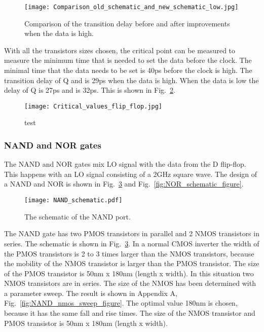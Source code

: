 \begin{figure}[h]
\texttt{[image: Comparison\_old\_schematic\_and\_new\_schematic\_low.jpg]}
\caption{ Comparison of the transition delay before and after improvements when the data is high.}
\label{fig:Comparison_old_schematic_and_new_schematic_low_figure}
\end{figure}

With all the transistors sizes chosen, the critical point can be measured to measure the minimum time that is needed to set the data before the clock. The minimal time that the data needs to be set is 40ps before the clock is high. The transition delay of Q and  is 29ps when the data is high. When the data is low the delay of Q is 27ps and  is 32ps. This is shown in Fig.~\ref{fig:Critical_values_flip_flop_figure}.
\begin{figure}[h]
\texttt{[image: Critical\_values\_flip\_flop.jpg]}
\caption{ test}
\label{fig:Critical_values_flip_flop_figure}
\end{figure}

\subsubsection{NAND and NOR gates}\label{sec:frontend}
The NAND and NOR gates mix LO signal with the data from the D flip-flop. This happens with an LO signal consisting of a 2GHz square wave.
The design of a NAND and NOR is shown in Fig.~\ref{fig:NAND_schematic_figure} and Fig.~\ref{fig:NOR_schematic_figure}.

\begin{figure}[htp]
\texttt{[image: NAND\_schematic.pdf]}
\caption{The schematic of the NAND port.}
\label{fig:NAND_schematic_figure}
\end{figure}

The NAND gate has two PMOS transistors in parallel and 2 NMOS transistors in series. The schematic is shown in Fig.~\ref{fig:NAND_schematic_figure}. In a normal CMOS inverter the width of the PMOS transistors is 2 to 3 times larger than the NMOS transistors, because the mobility of the NMOS transistor is larger than the PMOS transistor. The size of the PMOS transistor is 50nm x 180nm (length x width). In this situation two NMOS transistors are in series. The size of the NMOS has been determined with a parameter sweep. The result is shown in Appendix A, Fig.~\ref{fig:NAND_nmos_sweep_figure}. The optimal value 180nm is chosen, because it has the same fall and rise times. The size of the NMOS transistor and PMOS transistor is 50nm x 180nm (length x width).

